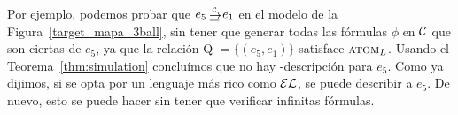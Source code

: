 \begin{table}[t]





Por ejemplo, podemos probar que $e_5 \simul{\+C} e_1$ en el modelo de la 
Figura~\ref{target_mapa_3ball}, sin tener que generar todas las f\'ormulas $\phi$ en $\mathcal{C}$ que son ciertas de $e_5$, ya que la relaci\'on Q $= \{(e_5,e_1) \}
$ satisface $\textsc{atom}_L$.
Usando el Teorema~\ref{thm:simulation} conclu\'imos que no hay
 \CL-descripci\'on para $e_5$. Como ya dijimos, si se opta por un lenguaje m\'as rico como $\mathcal{EL}$, se puede describir a $e_5$. De nuevo, esto se puede hacer sin tener que verificar infinitas f\'ormulas.




\end{table}
